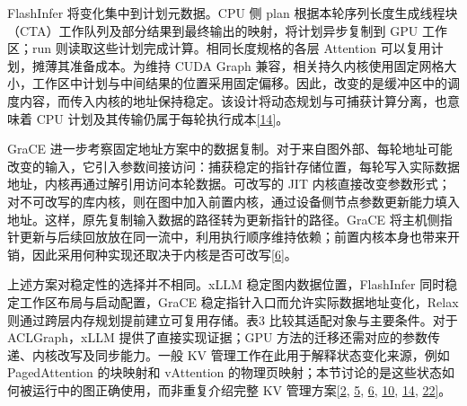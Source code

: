 \documentclass[UTF8,11pt,fontset=windows]{ctexart}
\begin{document}
FlashInfer 将变化集中到计划元数据。CPU 侧 plan 根据本轮序列长度生成线程块（CTA）工作队列及部分结果到最终输出的映射，将计划异步复制到 GPU 工作区；run 则读取这些计划完成计算。相同长度规格的各层 Attention 可以复用计划，摊薄其准备成本。为维持 CUDA Graph 兼容，相关持久内核使用固定网格大小，工作区中计划与中间结果的位置采用固定偏移。因此，改变的是缓冲区中的调度内容，而传入内核的地址保持稳定。该设计将动态规划与可捕获计算分离，也意味着 CPU 计划及其传输仍属于每轮执行成本\protect\hyperlink{ref-14}{{[}14{]}}。

GraCE 进一步考察固定地址方案中的数据复制。对于来自图外部、每轮地址可能改变的输入，它引入参数间接访问：捕获稳定的指针存储位置，每轮写入实际数据地址，内核再通过解引用访问本轮数据。可改写的 JIT 内核直接改变参数形式；对不可改写的库内核，则在图中加入前置内核，通过设备侧节点参数更新能力填入地址。这样，原先复制输入数据的路径转为更新指针的路径。GraCE 将主机侧指针更新与后续回放放在同一流中，利用执行顺序维持依赖；前置内核本身也带来开销，因此采用何种实现还取决于内核是否可改写\protect\hyperlink{ref-6}{{[}6{]}}。

上述方案对稳定性的选择并不相同。xLLM 稳定图内数据位置，FlashInfer 同时稳定工作区布局与启动配置，GraCE 稳定指针入口而允许实际数据地址变化，Relax 则通过跨层内存规划提前建立可复用存储。表3 比较其适配对象与主要条件。对于 ACLGraph，xLLM 提供了直接实现证据；GPU 方法的迁移还需对应的参数传递、内核改写及同步能力。一般 KV 管理工作在此用于解释状态变化来源，例如 PagedAttention 的块映射和 vAttention 的物理页映射；本节讨论的是这些状态如何被运行中的图正确使用，而非重复介绍完整 KV 管理方案\protect\hyperlink{ref-2}{{[}2}, \protect\hyperlink{ref-5}{5}, \protect\hyperlink{ref-6}{6}, \protect\hyperlink{ref-10}{10}, \protect\hyperlink{ref-14}{14}, \protect\hyperlink{ref-22}{22{]}}。
\end{document}
